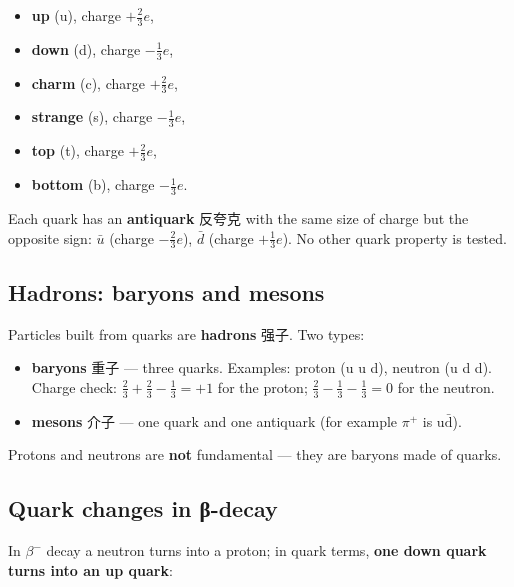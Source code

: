\documentclass[11pt]{article}
\begin{document}
\begin{itemize}
\item \textbf{up} (u), charge $+\tfrac{2}{3}e$,

\item \textbf{down} (d), charge $-\tfrac{1}{3}e$,

\item \textbf{charm} (c), charge $+\tfrac{2}{3}e$,

\item \textbf{strange} (s), charge $-\tfrac{1}{3}e$,

\item \textbf{top} (t), charge $+\tfrac{2}{3}e$,

\item \textbf{bottom} (b), charge $-\tfrac{1}{3}e$.

\end{itemize}

Each quark has an \textbf{antiquark} 反夸克 with the same size of charge but the opposite sign: $\bar{u}$ (charge $-\tfrac{2}{3}e$), $\bar{d}$ (charge $+\tfrac{1}{3}e$). No other quark property is tested.

\subsection*{Hadrons: baryons and mesons}

Particles built from quarks are \textbf{hadrons} 强子. Two types:

\begin{itemize}
\item \textbf{baryons} 重子 — three quarks. Examples: proton (u u d), neutron (u d d). Charge check: $\tfrac{2}{3} + \tfrac{2}{3} - \tfrac{1}{3} = +1$ for the proton; $\tfrac{2}{3} - \tfrac{1}{3} - \tfrac{1}{3} = 0$ for the neutron.

\item \textbf{mesons} 介子 — one quark and one antiquark (for example $\pi^{+}$ is u$\bar{\text{d}}$).

\end{itemize}

Protons and neutrons are \textbf{not} fundamental — they are baryons made of quarks.

\subsection*{Quark changes in β-decay}

In $\beta^{-}$ decay a neutron turns into a proton; in quark terms, \textbf{one down quark turns into an up quark}:
\end{document}
